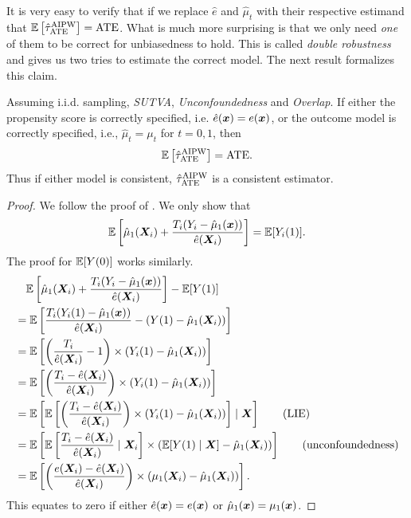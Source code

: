 \documentclass[11pt]{exam}
\begin{document}
It is very easy to verify that if we replace $\hat e$ and $\hat \mu_t$ with their respective estimand that $\mathbb{E}\left[\hat \tau_{\mathrm{ATE}}^{\mathrm{AIPW}}\right] = \mathrm{ATE}$. What is much more surprising is that we only need \emph{one} of them to be correct for unbiasedness to hold. This is called \emph{double robustness} and gives us two tries to estimate the correct model. The next result formalizes this claim.

\begin{theorem}
Assuming i.i.d. sampling, \emph{SUTVA}, \emph{Unconfoundedness} and \emph{Overlap}. If either the propensity score is correctly specified, i.e. $\hat e(\bm{x}) = e(\bm{x})$, or the outcome model is correctly specified, i.e., $\hat \mu_t = \mu_t$ for $t = 0, 1$, then
\[
   \mathbb{E}\left[\hat \tau_{\mathrm{ATE}}^{\mathrm{AIPW}}\right] = \mathrm{ATE}.
\]
Thus if either model is consistent, $\hat \tau_{\mathrm{ATE}}^{\mathrm{AIPW}}$ is a consistent estimator.
\end{theorem}

\begin{proof}
    We follow the proof of \citet[Theorem~12.1]{ding2023coursecausalinference}. We only show that 
    \[
        \mathbb{E}\left[\hat \mu_1(\bm{X}_i)  + \frac{T_i (Y_i - \hat \mu_1(\bm{x}))}{\hat e(\bm{X}_i)}\right] = \mathbb{E}[Y_i(1)].
    \]
    The proof for $\mathbb{E}[Y(0)]$ works similarly.
    \begin{align*}
        & \quad\mathbb{E}\left[\hat \mu_1(\bm{X}_i)  + \frac{T_i (Y_i - \hat \mu_1(\bm{x}))}{\hat e(\bm{X}_i)}\right] - \mathbb{E}[Y(1)] 
        \\
        &= \mathbb{E}\left[\frac{T_i (Y_i(1) - \hat \mu_1(\bm{x}))}{\hat e(\bm{X}_i)} - \left(Y(1) - \hat \mu_1(\bm{X}_i)\right)\right]
        \\
        &= \mathbb{E}\left[\left(\frac{T_i}{\hat e(\bm{X}_i)} - 1 \right) \times  \left(Y_i(1) - \hat \mu_1(\bm{X}_i)\right)\right]
        \\
        &= \mathbb{E}\left[\left(\frac{T_i - \hat e(\bm{X}_i)}{\hat e(\bm{X}_i)} \right) \times  \left(Y_i(1) - \hat \mu_1(\bm{X}_i)\right)\right]
        \\
        &= \mathbb{E}\left[\mathbb{E}\left[\left(\frac{T_i - \hat e(\bm{X}_i)}{\hat e(\bm{X}_i)} \right) \times  \left(Y_i(1) - \hat \mu_1(\bm{X}_i)\right)\right] \mid \bm{X} \right] \qquad \text{(LIE)}
        \\
        &= \mathbb{E}\left[\mathbb{E}\left[\frac{T_i - \hat e(\bm{X}_i)}{\hat e(\bm{X}_i)} \mid \bm{X}_i \right] \times  \left(\mathbb{E}[Y(1) \mid \bm{X}] - \hat \mu_1(\bm{X}_i)\right)\right] \qquad \text{(unconfoundedness)}
        \\
        &= \mathbb{E}\left[\left(\frac{e(\bm{X}_i) - \hat e(\bm{X}_i)}{\hat e(\bm{X}_i)}\right)  \times  \left(\mu_1(\bm{X}_i) - \hat \mu_1(\bm{X}_i)\right)\right].
    \end{align*}
    This equates to zero if either $\hat e(\bm{x}) = e(\bm{x})$ or $\hat \mu_1(\bm{x}) = \mu_1(\bm{x})$.
\end{proof}
\end{document}
